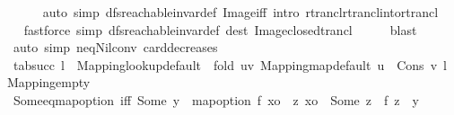\begin{isabellebody}
\ \ \ \ \isamarkupfalse%
\ {\isacharparenleft}{\kern0pt}auto\ simp{\isacharcolon}{\kern0pt}\ dfs{\isacharunderscore}{\kern0pt}reachable{\isacharunderscore}{\kern0pt}invar{\isacharunderscore}{\kern0pt}def\ Image{\isacharunderscore}{\kern0pt}iff\ intro{\isacharcolon}{\kern0pt}\ rtrancl{\isachardot}{\kern0pt}rtrancl{\isacharunderscore}{\kern0pt}into{\isacharunderscore}{\kern0pt}rtrancl{\isacharparenright}{\kern0pt}\isanewline
\ \ \isamarkupfalse%
\ \isamarkupfalse%
\ {\isacharparenleft}{\kern0pt}fastforce\ simp{\isacharcolon}{\kern0pt}\ dfs{\isacharunderscore}{\kern0pt}reachable{\isacharunderscore}{\kern0pt}invar{\isacharunderscore}{\kern0pt}def\ dest{\isacharcolon}{\kern0pt}\ Image{\isacharunderscore}{\kern0pt}closed{\isacharunderscore}{\kern0pt}trancl{\isacharparenright}{\kern0pt}\isanewline
\ \ \isamarkupfalse%
\ \isamarkupfalse%
\ blast\isanewline
\ \ \isamarkupfalse%
\ \isamarkupfalse%
\ {\isacharparenleft}{\kern0pt}auto\ simp{\isacharcolon}{\kern0pt}\ neq{\isacharunderscore}{\kern0pt}Nil{\isacharunderscore}{\kern0pt}conv\ card{\isacharunderscore}{\kern0pt}decreases{\isacharparenright}{\kern0pt}\isanewline
\ \ \isamarkupfalse%
%
\endisatagproof
{\isafoldproof}%
%
\isadelimproof
\isanewline
%
\endisadelimproof
\isanewline
{}\isamarkupfalse%
\isanewline
\isanewline
{}\isamarkupfalse%
\ {\isachardoublequoteopen}tab{\isacharunderscore}{\kern0pt}succ\ l\ {\isasymequiv}\ Mapping{\isachardot}{\kern0pt}lookup{\isacharunderscore}{\kern0pt}default\ {\isacharbrackleft}{\kern0pt}{\isacharbrackright}{\kern0pt}\ {\isacharparenleft}{\kern0pt}fold\ {\isacharparenleft}{\kern0pt}{\isasymlambda}{\isacharparenleft}{\kern0pt}u{\isacharcomma}{\kern0pt}v{\isacharparenright}{\kern0pt}{\isachardot}{\kern0pt}\ Mapping{\isachardot}{\kern0pt}map{\isacharunderscore}{\kern0pt}default\ u\ {\isacharbrackleft}{\kern0pt}{\isacharbrackright}{\kern0pt}\ {\isacharparenleft}{\kern0pt}Cons\ v{\isacharparenright}{\kern0pt}{\isacharparenright}{\kern0pt}\ l\ Mapping{\isachardot}{\kern0pt}empty{\isacharparenright}{\kern0pt}{\isachardoublequoteclose}\isanewline
\isanewline
\isanewline
{}\isamarkupfalse%
\ Some{\isacharunderscore}{\kern0pt}eq{\isacharunderscore}{\kern0pt}map{\isacharunderscore}{\kern0pt}option\ {\isacharbrackleft}{\kern0pt}iff{\isacharbrackright}{\kern0pt}{\isacharcolon}{\kern0pt}\ {\isachardoublequoteopen}{\isacharparenleft}{\kern0pt}Some\ y\ {\isacharequal}{\kern0pt}\ map{\isacharunderscore}{\kern0pt}option\ f\ xo{\isacharparenright}{\kern0pt}\ {\isacharequal}{\kern0pt}\ {\isacharparenleft}{\kern0pt}{\isasymexists}z{\isachardot}{\kern0pt}\ xo\ {\isacharequal}{\kern0pt}\ Some\ z\ {\isasymand}\ f\ z\ {\isacharequal}{\kern0pt}\ y{\isacharparenright}{\kern0pt}{\isachardoublequoteclose}\isanewline

\end{isabellebody}
